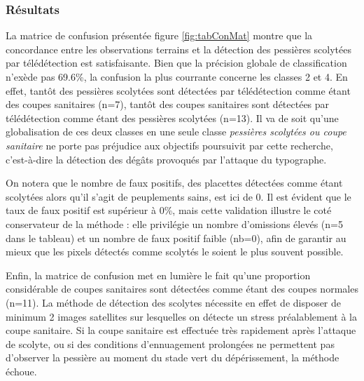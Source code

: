 \documentclass[a4paper, 12pt]{article} %
\begin{document}

\subsubsection{Résultats}

La matrice de confusion présentée figure \ref{fig:tabConMat} montre que la concordance entre les observations terrains et la détection des pessières scolytées par télédétection est satisfaisante. Bien que la précision globale de classification n'exède pas 69.6\%, la confusion la plus courrante concerne les classes 2 et 4. En effet, tantôt des pessières scolytées sont détectées par télédétection comme étant des coupes sanitaires (n=7), tantôt des coupes sanitaires sont détectées par télédétection comme étant des pessières scolytées (n=13). Il va de soit qu'une globalisation de ces deux classes en une seule classe \textit{pessières scolytées ou coupe sanitaire} ne porte pas préjudice aux objectifs poursuivit par cette recherche, c'est-à-dire la détection des dégâts provoqués par l'attaque du typographe.

On notera que le nombre de faux positifs, des placettes détectées comme étant scolytées alors qu'il s'agit de peuplements sains, est ici de 0. Il est évident que le taux de faux positif est supérieur à 0\%, mais cette validation illustre le coté conservateur de la méthode : elle privilégie un nombre d'omissions élevés (n=5 dans le tableau) et un nombre de faux positif faible (nb=0), afin de garantir au mieux que les pixels détectés comme scolytés le soient le plus souvent possible.

Enfin, la matrice de confusion met en lumière le fait qu'une proportion considérable de coupes sanitaires sont détectées comme étant des coupes normales (n=11). La méthode de détection des scolytes nécessite en effet de disposer de minimum 2 images satellites sur lesquelles on détecte un stress préalablement à la coupe sanitaire. Si la coupe sanitaire est effectuée très rapidement après l'attaque de scolyte, ou si des conditions d'ennuagement prolongées ne permettent pas d'observer la pessière au moment du stade vert du dépérissement, la méthode échoue.
\end{document}
